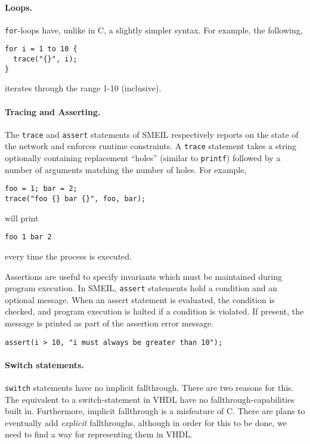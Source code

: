 \paragraph{Loops.}\texttt{for}-loops have, unlike in C, a slightly simpler syntax. For example,
the following,
\begin{lstlisting}[language=smeil]
for i = 1 to 10 {
  trace("{}", i);
}
\end{lstlisting}
iterates through the range 1-10 (inclusive).

\paragraph{Tracing and Asserting.}The {\tt trace} and {\tt assert} statements of
SMEIL respectively reports on the state of the network and enforces runtime
constraints. A {\tt trace} statement takes a string optionally containing
replacement ``holes'' (similar to {\tt printf}) followed by a number of
arguments matching the number of holes. For example,
\begin{lstlisting}[language=smeil]
foo = 1; bar = 2;
trace("foo {} bar {}", foo, bar);
\end{lstlisting}
will print
\begin{verbatim}
foo 1 bar 2
\end{verbatim}
every time the process is executed.

Assertions are useful to specify invariants which must be maintained during
program execution. In SMEIL, {\tt assert} statements hold a condition and an
optional message. When an assert statement is evaluated, the condition is
checked, and program execution is halted if a condition is violated. If present,
the message is printed as part of the assertion error message.
\begin{lstlisting}[language=smeil]
assert(i > 10, "i must always be greater than 10");
\end{lstlisting}


\paragraph{Switch statements.} \texttt{switch} statements have no implicit
fallthrough. There are two reasons for this. The equivalent to a
switch-statement in VHDL have no fallthrough-capabilities built in. Furthermore,
implicit fallthrough is a misfeature of C. There are plans to eventually add
{\itshape explicit} fallthroughs, although in order for this to be done, we need
to find a way for representing them in VHDL.

